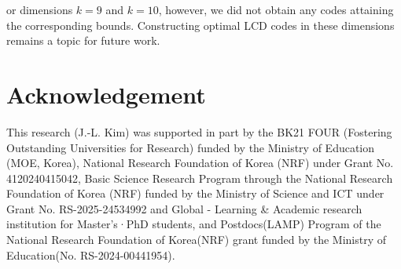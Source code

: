 \documentclass{article}
\theoremstyle{definition}
\theoremstyle{remark}
\begin{document}
or dimensions $k=9$ and $k=10$, however, we did not obtain any codes attaining the corresponding bounds. Constructing optimal LCD codes in these dimensions remains a topic for future work.

\section*{Acknowledgement}
This research (J.-L. Kim) was supported in part by the BK21 FOUR (Fostering Outstanding Universities for Research) funded by the Ministry of Education (MOE, Korea), National Research Foundation of Korea (NRF) under Grant No. 4120240415042, Basic Science Research Program through the National Research Foundation of Korea (NRF) funded by the Ministry of Science and ICT under Grant No. RS-2025-24534992 and Global - Learning \& Academic research institution for Master’s·PhD students, and Postdocs(LAMP) Program of the National Research Foundation of Korea(NRF) grant funded by the Ministry of Education(No. RS-2024-00441954).
\end{document}
